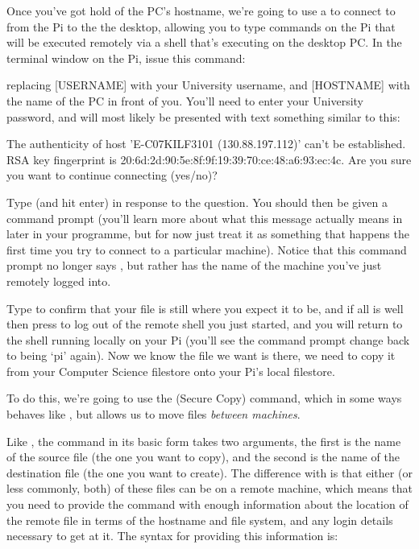 Once you've got hold of the PC's hostname, we're going to use a  to connect to from the Pi to the the desktop, allowing you to type commands on the Pi that will be executed remotely via a shell that's executing on the desktop PC. In the terminal window on the Pi, issue this command:


replacing [USERNAME] with your University username, and [HOSTNAME] with the name of the PC in front of you. You'll need to enter your University password, and will most likely be presented with text something similar to this:

\begin{ttoutenv}
The authenticity of host 'E-C07KILF3101 (130.88.197.112)' can't be established.
RSA key fingerprint is 20:6d:2d:90:5e:8f:9f:19:39:70:ce:48:a6:93:ec:4c.
Are you sure you want to continue connecting (yes/no)? 
\end{ttoutenv}

Type  (and hit enter) in response to the question. You should then be given a command prompt (you'll learn more about what this message actually means in later in your programme, but for now just treat it as something that happens the first time you try to connect to a particular machine). Notice that this command prompt no longer says , but rather has the name of the machine you've just remotely logged into. 

Type  to confirm that your  file is still where you expect it to be, and if all is well then press  to log out of the remote shell you just started, and you will return to the shell running locally on your Pi (you'll see the command prompt change back to being `pi' again). Now we know the file we want is there, we need to copy it from your Computer Science filestore onto your Pi's local filestore.

To do this, we're going to use the  (Secure Copy) command, which in some ways behaves like , but allows us to move files \textit{between machines}. 

Like , the  command in its basic form takes two arguments, the first is the name of the source file (the one you want to copy), and the second is the name of the destination file (the one you want to create). The difference with  is that either (or less commonly, both) of these files can be on a remote machine, which means that you need to provide the command with enough information about the location of the remote file in terms of the hostname and file system, and any login details necessary to get at it. The syntax for providing this information is:


